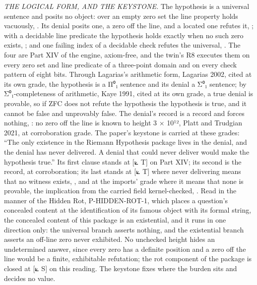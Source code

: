 \documentclass[10pt,twocolumn]{article}
\begin{document}
\emph{THE LOGICAL FORM, AND THE KEYSTONE.} The hypothesis is a universal
sentence and posits no object: over an empty zero set the line property
holds vacuously,
\texttt{}. Its denial
posits one, a zero off the line, and a located one refutes it,
\texttt{}; with a
decidable line predicate the hypothesis holds exactly when no such zero
exists, \texttt{}; and
one failing index of a decidable check refutes the universal,
\texttt{}. The four
are Part XIV of the engine, axiom-free, and the twin's R8 executes them
on every zero set and line predicate of a three-point domain and on
every check pattern of eight bits. Through Lagarias's arithmetic form,
Lagarias 2002, cited at its own grade, the hypothesis is a Π⁰₁ sentence
and its denial a Σ⁰₁ sentence; by Σ⁰₁-completeness of arithmetic, Kaye
1991, cited at its own grade, a true denial is provable, so if ZFC does
not refute the hypothesis the hypothesis is true, and it cannot be false
and unprovably false. The denial's record is a record and forces
nothing, \texttt{}: no zero off the
line is known to height 3 × 10¹², Platt and Trudgian 2021, at
corroboration grade. The paper's keystone is carried at these grades:
``The only existence in the Riemann Hypothesis package lives in the
denial, and the denial has never delivered. A denial that could never
deliver would make the hypothesis true.'' Its first clause stands at
{[}⟀ T{]} on Part XIV; its second is the record, at corroboration; its
last stands at {[}⟀ T{]} where never delivering means that no witness
exists, \texttt{}, and at
the imports' grade where it means that none is provable, the implication
from the carried field kernel-checked,
\texttt{}. Read in the manner of
the Hidden Rot, P-HIDDEN-ROT-1, which places a question's concealed
content at the identification of its famous object with its formal
string, the concealed content of this package is an existential, and it
runs in one direction only: the universal branch asserts nothing, and
the existential branch asserts an off-line zero never exhibited. No
unchecked height hides an undetermined answer, since every zero has a
definite position and a zero off the line would be a finite, exhibitable
refutation; the rot component of the package is closed at {[}⟀ S{]} on
this reading. The keystone fixes where the burden sits and decides no
value.
\end{document}
